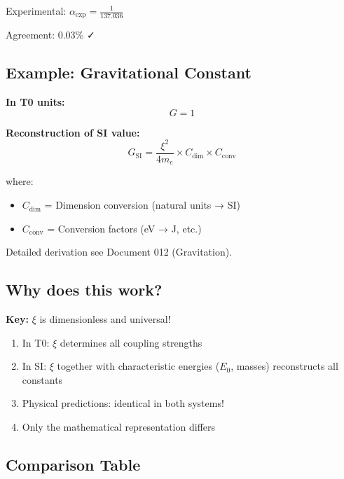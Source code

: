 	Experimental: $\alpha_{\text{exp}} = \frac{1}{137.036}$
	
	Agreement: 0.03\% ✓
	
	\subsection{Example: Gravitational Constant}
	
	\textbf{In T0 units:}
	\begin{equation}
		G = 1
	\end{equation}
	
	\textbf{Reconstruction of SI value:}
	\begin{equation}
		G_{\text{SI}} = \frac{\xi^2}{4m_e} \times C_{\text{dim}} \times C_{\text{conv}}
	\end{equation}
	
	where:
	\begin{itemize}
		\item $C_{\text{dim}}$ = Dimension conversion (natural units → SI)
		\item $C_{\text{conv}}$ = Conversion factors (eV → J, etc.)
	\end{itemize}
	
	Detailed derivation see Document 012 (Gravitation).
	
	\subsection{Why does this work?}
	
	\textbf{Key:} $\xi$ is dimensionless and universal!
	
	\begin{enumerate}
		\item In T0: $\xi$ determines all coupling strengths
		
		\item In SI: $\xi$ together with characteristic energies ($E_0$, masses) reconstructs all constants
		
		\item Physical predictions: identical in both systems!
		
		\item Only the mathematical representation differs
	\end{enumerate}
	
	\subsection{Comparison Table}
	
